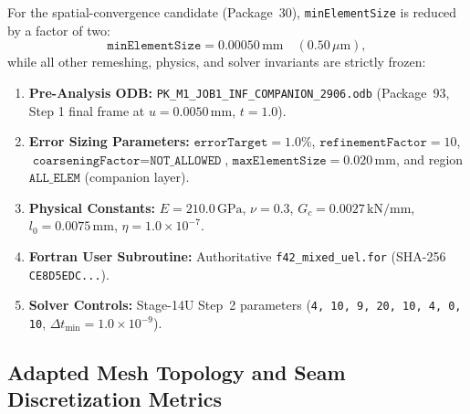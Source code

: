 For the spatial-convergence candidate (Package~30), \texttt{minElementSize} is reduced by a factor of two:
\begin{equation}
  \texttt{minElementSize} = 0.00050\,\mathrm{mm} \quad (0.50\,\mu\mathrm{m}),
\end{equation}
while all other remeshing, physics, and solver invariants are strictly frozen:
\begin{enumerate}
  \item \textbf{Pre-Analysis ODB:} \texttt{PK\_M1\_JOB1\_INF\_COMPANION\_2906.odb} (Package~93, Step 1 final frame at $u = 0.0050\,\mathrm{mm}$, $t = 1.0$).
  \item \textbf{Error Sizing Parameters:} $\texttt{errorTarget} = 1.0\%$, $\texttt{refinementFactor} = 10$, $\texttt{coarseningFactor} = \texttt{NOT\_ALLOWED}$, $\texttt{maxElementSize} = 0.020\,\mathrm{mm}$, and region $\texttt{ALL\_ELEM}$ (companion layer).
  \item \textbf{Physical Constants:} $E = 210.0\,\mathrm{GPa}$, $\nu = 0.3$, $G_c = 0.0027\,\mathrm{kN/mm}$, $l_0 = 0.0075\,\mathrm{mm}$, $\eta = 1.0\times 10^{-7}$.
  \item \textbf{Fortran User Subroutine:} Authoritative \texttt{f42\_mixed\_uel.for} (SHA-256 \texttt{CE8D5EDC...}).
  \item \textbf{Solver Controls:} Stage-14U Step~2 parameters (\texttt{4, 10, 9, 20, 10, 4, 0, 10}, $\Delta t_{\min} = 1.0\times 10^{-9}$).
\end{enumerate}

\subsection{Adapted Mesh Topology and Seam Discretization Metrics}
\label{subsec:stage14uam_mesh_topology}

